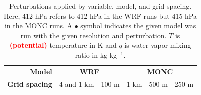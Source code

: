 \documentclass[draft]{agujournal2019}
\newcommand{\todo}[1]{\textcolor{red}{\textbf{(#1)}}}
\begin{document}
{
\begin{table}
    \centering
    \caption{Perturbations applied by variable, model, and grid spacing. Here,
    412 hPa refers to 412 hPa in the WRF runs but 415 hPa in the MONC runs. A
    $\bullet{}$ symbol indicates the given model was run with the given
    resolution and perturbation. $T$ is \todo{potential} temperature in K and
    $q$ is water vapor mixing ratio in kg kg$^{-1}$.}
    \label{tab:pert_runs}
    \renewcommand{\arraystretch}{0.6}
    \begin{tabular}{lllccccc}
        \multicolumn{3}{r}{\textbf{Model}} & \multicolumn{2}{c}{\textbf{WRF}} & \multicolumn{3}{c}{\textbf{MONC}} \\
        \multicolumn{3}{r}{\textbf{Grid spacing}} & 4 and 1 km & 100 m & 1 km & 500 m & 250 m \\
        

\end{tabular}
\end{table}}
\end{document}
